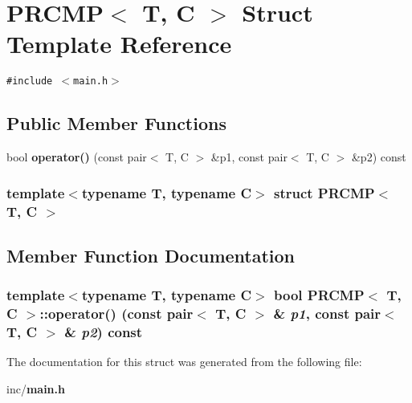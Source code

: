 \section{PRCMP$<$ T, C $>$ Struct Template Reference}
\label{structPRCMP}
{\tt \#include $<$main.h$>$}

\subsection*{Public Member Functions}
\begin{CompactItemize}
\item 
bool {\bf operator()} (const pair$<$ T, C $>$ \&p1, const pair$<$ T, C $>$ \&p2) const
\end{CompactItemize}
\subsubsection*{template$<$typename T, typename C$>$ struct PRCMP$<$ T, C $>$}



\subsection{Member Function Documentation}
\subsubsection{\setlength{\rightskip}{0pt plus 5cm}template$<$typename T, typename C$>$ bool {\bf PRCMP}$<$ T, C $>$::operator() (const pair$<$ T, C $>$ \& {\em p1}, const pair$<$ T, C $>$ \& {\em p2}) const\hspace{0.3cm}{\tt  [inline]}}\label{structPRCMP_d6ee734553194295afa2732c649f336d}




The documentation for this struct was generated from the following file:\begin{CompactItemize}
\item 
inc/{\bf main.h}\end{CompactItemize}
